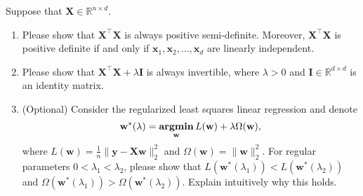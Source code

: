 \documentclass[11pt,letter,notitlepage]{article}
\DeclareMathOperator*{\argmin}{\bf argmin}
\begin{document}
	\newpage

	\begin{exercise}
		Suppose that $\mathbf{X}\in \mathbb{R}^{n\times d}$.
		\begin{enumerate}
			\item Please show that $\mathbf{X}^{\top}\mathbf{X}$ is always positive semi-definite. Moreover, $\mathbf{X}^{\top}\mathbf{X}$ is positive definite if and only if $\mathbf{x}_1, \mathbf{x}_2, \dots, \mathbf{x}_d$ are linearly independent.
			\item Please show that $\mathbf{X}^{\top}\mathbf{X} + \lambda \mathbf{I}$ is always invertible, where $\lambda>0$ and $\mathbf{I}\in \mathbb{R}^{d\times d}$ is an identity matrix.
			\item (Optional) Consider the regularized least squares linear regression and denote
			$$
			\mathbf{w}^*(\lambda)=\argmin_\mathbf{w} L(\mathbf{w})+\lambda \Omega(\mathbf{w}),
			$$
			where $L(\mathbf{w})=\frac{1}{n}\|\mathbf{y}-\mathbf{Xw}\|_2^2$ and $\Omega(\mathbf{w})=\|\mathbf{w}\|_2^2$. For regular parameters $0<\lambda_1<\lambda_2$, please show that $L(\mathbf{w}^*(\lambda_1)) < L(\mathbf{w}^*(\lambda_2))$ and $\Omega (\mathbf{w}^*(\lambda_1)) > \Omega (\mathbf{w}^*(\lambda_2))$. Explain intuitively why this holds.
		\end{enumerate}
		
		
	\end{exercise}
\end{document}
